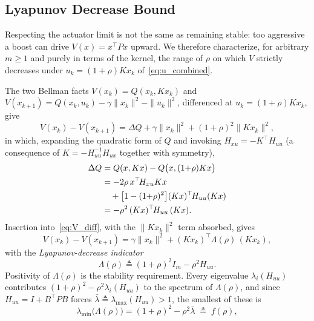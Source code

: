 \documentclass[final,5p,times,authoryear]{elsarticle}
\theoremstyle{plain}
\theoremstyle{definition}
\theoremstyle{remark}
\begin{document}
\subsection{Lyapunov Decrease Bound}\label{sec:lyapunov}

Respecting the actuator limit is not the same as remaining stable:
too aggressive a boost can drive $V(x) = x^\top Px$ upward.  We
therefore characterize, for arbitrary $m \geq 1$ and purely in terms
of the kernel, the range of $\rho$ on which $V$ strictly decreases
under $u_k = (1+\rho)Kx_k$ of~\eqref{eq:u_combined}.

The two Bellman facts $V(x_k) = Q(x_k,Kx_k)$ and
$V(x_{k+1}) = Q(x_k,u_k) - \gamma\|x_k\|^2 - \|u_k\|^2$, differenced
at $u_k = (1+\rho)Kx_k$, give
\begin{equation}
V(x_k) - V(x_{k+1})
   = \Delta Q + \gamma\|x_k\|^2 + (1+\rho)^2\|Kx_k\|^2,
\label{eq:V_diff}
\end{equation}
in which, expanding the quadratic form of $Q$ and invoking
$H_{xu} = -K^\top H_{uu}$ (a consequence of $K = -H_{uu}^{-1}H_{ux}$
together with symmetry),
\begin{align}
\Delta Q
   &= Q(x,Kx) - Q\bigl(x,(1{+}\rho)Kx\bigr) \notag\\
   &= -2\rho\,x^\top\! H_{xu}Kx \notag\\
   &\quad {}+ \bigl[1-(1{+}\rho)^2\bigr](Kx)^\top\! H_{uu}(Kx) \notag\\
   &= -\rho^2\,(Kx)^\top\! H_{uu}\,(Kx).
\label{eq:DeltaQ_final}
\end{align}
Insertion into~\eqref{eq:V_diff}, with the $\|Kx_k\|^2$ term
absorbed, gives
\begin{equation}
V(x_k) - V(x_{k+1})
   = \gamma\|x_k\|^2 + (Kx_k)^\top \Lambda(\rho)\,(Kx_k),
\label{eq:lyap_decrease}
\end{equation}
with the \emph{Lyapunov-decrease indicator}
\begin{equation}
\boxed{\,\Lambda(\rho) \triangleq (1+\rho)^2 I_m - \rho^2 H_{uu}.\,}
\label{eq:Lambda}
\end{equation}
Positivity of $\Lambda(\rho)$ is the stability requirement.  Every
eigenvalue $\lambda_i(H_{uu})$ contributes
$(1+\rho)^2 - \rho^2\lambda_i(H_{uu})$ to the spectrum of
$\Lambda(\rho)$, and since $H_{uu} = I + B^\top PB$ forces
$\bar\lambda \triangleq \lambda_{\max}(H_{uu}) > 1$, the smallest of
these is
\begin{equation}
\lambda_{\min}\!\big(\Lambda(\rho)\big)
   = (1+\rho)^2 - \rho^2\bar\lambda \;\triangleq\; f(\rho),
\label{eq:Lambda_min}
\end{equation}
\end{document}
